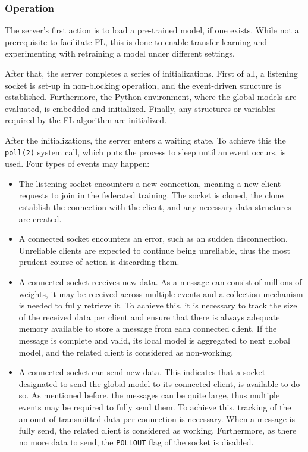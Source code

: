 \subsubsection{Operation}
The server's first action is to load a pre-trained model, if one exists. While not a prerequisite to facilitate FL, this is done to enable transfer learning and experimenting with retraining a model under different settings. 

After that, the server completes a series of initializations. First of all, a listening socket is set-up in non-blocking operation, and the event-driven structure is established. Furthermore, the Python environment, where the global models are evaluated, is embedded and initialized. Finally, any structures or variables required by the FL algorithm are initialized.

After the initializations, the server enters a waiting state. To achieve this the \texttt{poll(2)} system call, which puts the process to sleep until an event occurs, is used. Four types of events may happen:
\begin{itemize}[leftmargin=*]
    \item The listening socket encounters a new connection, meaning a new client requests to join in the federated training. The socket is cloned, the clone establish the connection with the client, and any necessary data structures are created.
    \item A connected socket encounters an error, such as an sudden disconnection. Unreliable clients are expected to continue being unreliable, thus the most prudent course of action is discarding them.
    \item A connected socket receives new data. As a message can consist of millions of weights, it may be received across multiple events and a collection mechanism is needed to fully retrieve it. To achieve this, it is necessary to track the size of the received data per client and ensure that there is always adequate memory available to store a message from each connected client. If the message is complete and valid, its local model is aggregated to next global model, and the related client is considered as non-working.
    \item A connected socket can send new data. This indicates that a socket designated to send the global model to its connected client, is available to do so. As mentioned before, the messages can be quite large, thus multiple events may be required to fully send them. To achieve this, tracking of the amount of transmitted data per connection is necessary. When a message is fully send, the related client is considered as working. Furthermore, as there no more data to send, the \texttt{POLLOUT} flag of the socket is disabled.
\end{itemize}

